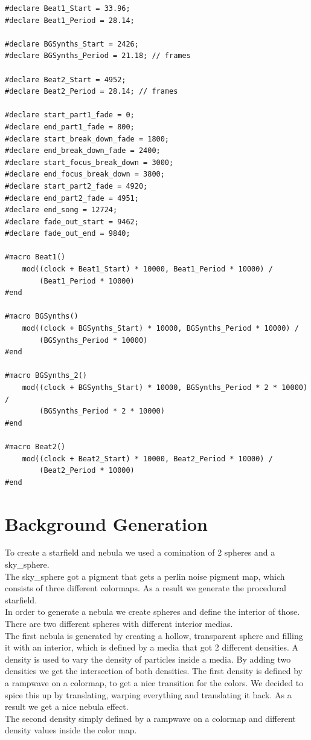 \documentclass[a4paper, 12pt]{scrartcl}
\begin{document}
    \begin{verbatim}
#declare Beat1_Start = 33.96;
#declare Beat1_Period = 28.14;

#declare BGSynths_Start = 2426;
#declare BGSynths_Period = 21.18; // frames

#declare Beat2_Start = 4952;
#declare Beat2_Period = 28.14; // frames

#declare start_part1_fade = 0;
#declare end_part1_fade = 800;
#declare start_break_down_fade = 1800;
#declare end_break_down_fade = 2400;
#declare start_focus_break_down = 3000;
#declare end_focus_break_down = 3800;
#declare start_part2_fade = 4920;
#declare end_part2_fade = 4951;
#declare end_song = 12724;
#declare fade_out_start = 9462;
#declare fade_out_end = 9840;

#macro Beat1()
    mod((clock + Beat1_Start) * 10000, Beat1_Period * 10000) /
        (Beat1_Period * 10000)
#end

#macro BGSynths()
    mod((clock + BGSynths_Start) * 10000, BGSynths_Period * 10000) /
        (BGSynths_Period * 10000)
#end

#macro BGSynths_2()
    mod((clock + BGSynths_Start) * 10000, BGSynths_Period * 2 * 10000) /
        (BGSynths_Period * 2 * 10000)
#end

#macro Beat2()
    mod((clock + Beat2_Start) * 10000, Beat2_Period * 10000) /
        (Beat2_Period * 10000)
#end
    \end{verbatim}

    \section{Background Generation}
    \label{sec:background}

    To create a starfield and nebula we used a comination of 2 spheres and a sky\_sphere. \\ 
    The sky\_sphere got a pigment that gets a perlin noise pigment map, which consists of three different colormaps. As a result we generate the procedural starfield. \\
    In order to generate a nebula we create spheres and define the interior of those. There are two different spheres with different interior medias. \\
    The first nebula is generated by creating a hollow, transparent sphere and filling it with an interior, which is defined by a media that got 2 different densities. A density is used to vary the density of particles inside a media.
    By adding two densities we get the intersection of both densities. The first density is defined by a rampwave on a colormap, to get a nice transition for the colors. We decided to spice this up by translating, warping everything and translating it back. As a result we get a nice nebula effect. \\
    The second density simply defined by a rampwave on a colormap and different density values inside the color map.
\end{document}
